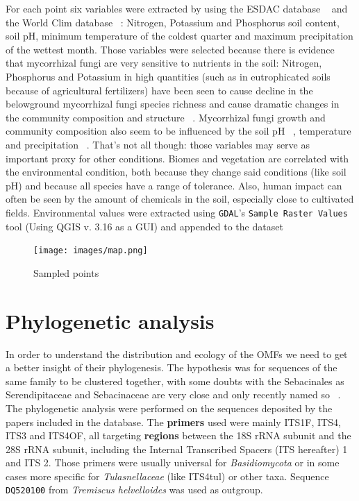 For each point six variables were extracted by using the ESDAC database ~\citep{esdac} and the World Clim database ~\citep{worldclim}: Nitrogen, Potassium and Phosphorus soil content, soil pH, minimum temperature of the coldest quarter and maximum precipitation of the wettest month. Those variables were selected because there is evidence that mycorrhizal fungi are very sensitive to nutrients in the soil: Nitrogen, Phosphorus and Potassium in high quantities (such as in eutrophicated soils because of agricultural fertilizers) have been seen to cause decline in the belowground mycorrhizal fungi species richness and cause dramatic changes in the community composition and structure ~\citep{lilleskov2002, baar2002, grant2011}. Mycorrhizal fungi growth and community composition also seem to be influenced by the soil pH ~\citep{aarle2002, carrino-kyker2016}, temperature and precipitation ~\citep{rillig2003}. That's not all though: those variables may serve as important proxy for other conditions. Biomes and vegetation are correlated with the environmental condition, both because they change said conditions (like soil pH) and because all species have a range of tolerance. Also, human impact can often be seen by the amount of chemicals in the soil, especially close to cultivated fields.
Environmental values were extracted using \texttt{GDAL}'s \texttt{Sample Raster Values} tool (Using QGIS v. 3.16 as a GUI) and appended to the dataset

\begin{figure}[htbp]
\centering
\texttt{[image: images/map.png]}
\caption{Sampled points}
\end{figure}

\chapter{Phylogenetic analysis}
\label{phylogeneticanalysis}

In order to understand the distribution and ecology of the OMFs we need to get a better insight of their phylogenesis. The hypothesis was for sequences of the same family to be clustered together, with some doubts with the Sebacinales as Serendipitaceae and Sebacinaceae are very close and only recently named so ~\citep{weiss2016}.
The phylogenetic analysis were performed on the sequences deposited by the papers included in the database.
The \textbf{primers} used were mainly ITS1F, ITS4, ITS3 and ITS4OF, all targeting \textbf{regions} between the 18S rRNA subunit and the 28S rRNA subunit, including the Internal Transcribed Spacers (ITS hereafter) 1 and ITS 2. Those primers were usually universal for \emph{Basidiomycota} or in some cases more specific for \emph{Tulasnellaceae} (like ITS4tul) or other taxa.
Sequence \texttt{DQ520100} from \emph{Tremiscus helvelloides} was used as outgroup.

